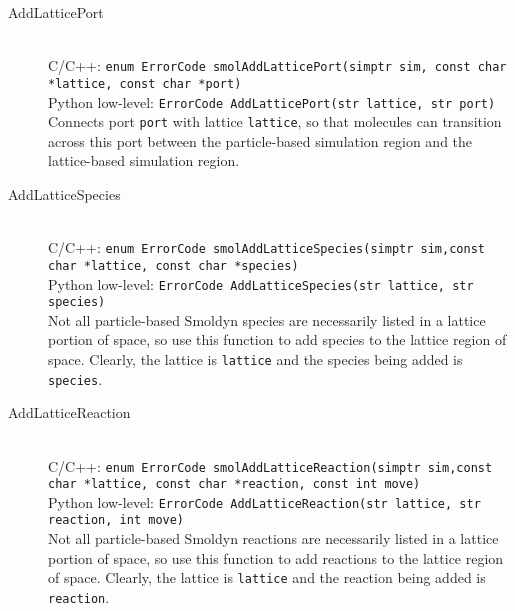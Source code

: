 \documentclass {book}
\newcommand {\ttt} {\texttt}
\begin{document}
\begin{description}
\item[AddLatticePort]
\hfill \\
C/C++: \ttt{enum ErrorCode smolAddLatticePort(simptr sim, const char *lattice, const char *port)}\\
Python low-level: \ttt{ErrorCode AddLatticePort(str lattice, str port)}\\
Connects port \ttt{port} with lattice \ttt{lattice}, so that molecules can transition across this port between the particle-based simulation region and the lattice-based simulation region.

\item[AddLatticeSpecies]
\hfill \\
C/C++: \ttt{enum ErrorCode smolAddLatticeSpecies(simptr sim,const char *lattice, const char *species)}\\
Python low-level: \ttt{ErrorCode AddLatticeSpecies(str lattice, str species)}\\
Not all particle-based Smoldyn species are necessarily listed in a lattice portion of space, so use this function to add species to the lattice region of space. Clearly, the lattice is \ttt{lattice} and the species being added is \ttt{species}.

\item[AddLatticeReaction]
\hfill \\
C/C++: \ttt{enum ErrorCode smolAddLatticeReaction(simptr sim,const char *lattice, const char *reaction, const int move)}\\
Python low-level: \ttt{ErrorCode AddLatticeReaction(str lattice, str reaction, int move)}\\
Not all particle-based Smoldyn reactions are necessarily listed in a lattice portion of space, so use this function to add reactions to the lattice region of space. Clearly, the lattice is \ttt{lattice} and the reaction being added is \ttt{reaction}.

\end{description}
\end{document}
